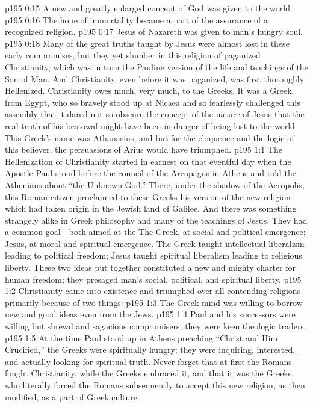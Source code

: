 \pc \vs p195 0:15 \bibnobreakspace A new and greatly enlarged concept of God was given to the world.
\pc \vs p195 0:16 \bibnobreakspace The hope of immortality became a part of the assurance of a recognized religion.
\pc \vs p195 0:17 \bibnobreakspace Jesus of Nazareth was given to man’s hungry soul.
\pc \vs p195 0:18 Many of the great truths taught by Jesus were almost lost in these early compromises, but they yet slumber in this religion of paganized Christianity, which was in turn the Pauline version of the life and teachings of the Son of Man. And Christianity, even before it was paganized, was first thoroughly Hellenized. Christianity owes much, very much, to the Greeks. It was a Greek, from Egypt, who so bravely stood up at Nicaea and so fearlessly challenged this assembly that it dared not so obscure the concept of the nature of Jesus that the real truth of his bestowal might have been in danger of being lost to the world. This Greek’s name was Athanasius, and but for the eloquence and the logic of this believer, the persuasions of Arius would have triumphed.\plusone
{}
\vs p195 1:1 The Hellenization of Christianity started in earnest on that eventful day when the Apostle Paul stood before the council of the Areopagus in Athens and told the Athenians about “the Unknown God.” There, under the shadow of the Acropolis, this Roman citizen proclaimed to these Greeks his version of the new religion which had taken origin in the Jewish land of Galilee. And there was something strangely alike in Greek philosophy and many of the teachings of Jesus. They had a common goal---both aimed at the  The Greek, at social and political emergence; Jesus, at moral and spiritual emergence. The Greek taught intellectual liberalism leading to political freedom; Jesus taught spiritual liberalism leading to religious liberty. These two ideas put together constituted a new and mighty charter for human freedom; they presaged man’s social, political, and spiritual liberty.
\vs p195 1:2 Christianity came into existence and triumphed over all contending religions primarily because of two things:
\pc \vs p195 1:3 \bibnobreakspace The Greek mind was willing to borrow new and good ideas even from the Jews.
\vs p195 1:4 \bibnobreakspace Paul and his successors were willing but shrewd and sagacious compromisers; they were keen theologic traders.
\pc \vs p195 1:5 At the time Paul stood up in Athens preaching “Christ and Him Crucified,” the Greeks were spiritually hungry; they were inquiring, interested, and actually looking for spiritual truth. Never forget that at first the Romans fought Christianity, while the Greeks embraced it, and that it was the Greeks who literally forced the Romans subsequently to accept this new religion, as then modified, as a part of Greek culture.
